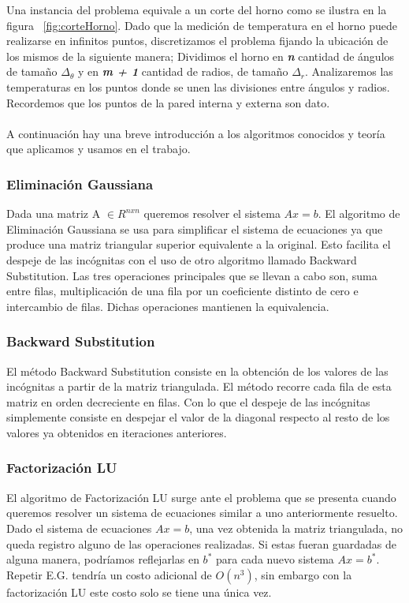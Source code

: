 Una instancia del problema equivale a un corte del horno como se ilustra en la figura ~\ref{fig:corteHorno}. Dado que la medición de temperatura en el horno puede realizarse en infinitos puntos, discretizamos el problema fijando la ubicación de los mismos de la siguiente manera; Dividimos el horno en \textbf{\textit{n}} cantidad de ángulos de tamaño $\Delta_{\theta}$ y en \textbf{\textit{m + 1}} cantidad de radios, de tamaño $\Delta_{r}$. Analizaremos las temperaturas en los puntos donde se unen las divisiones entre ángulos y radios. Recordemos que los puntos de la pared interna y externa son dato.\\
\\






A continuación hay una breve introducción a los algoritmos conocidos y teoría que aplicamos y usamos en el trabajo.

\subsubsection{Eliminación Gaussiana}
Dada una matriz A $\in R^{nxn}$ queremos resolver el sistema $Ax = b$. El algoritmo de Eliminación Gaussiana se usa para simplificar el sistema de ecuaciones ya que produce una matriz triangular superior equivalente a la original. Esto facilita el despeje de las incógnitas con el uso de otro algoritmo llamado Backward Substitution. Las tres operaciones principales que se llevan a cabo son, suma entre filas, multiplicación de una fila por un coeficiente distinto de cero e intercambio de filas. Dichas operaciones mantienen la equivalencia.

\subsubsection{Backward Substitution}
El método Backward Substitution consiste en la obtención de los valores de las incógnitas a partir de la matriz triangulada. El método recorre cada fila de esta matriz en orden decreciente en filas. Con lo que el despeje de las incógnitas simplemente consiste en despejar el valor de la diagonal respecto al resto de los valores ya obtenidos en iteraciones anteriores.

\subsubsection{Factorización LU}
El algoritmo de Factorización LU surge ante el problema que se presenta cuando queremos resolver un sistema de ecuaciones similar a uno anteriormente resuelto. Dado el sistema de ecuaciones $Ax = b$, una vez obtenida la matriz triangulada, no queda registro alguno de las operaciones realizadas. Si estas fueran guardadas de alguna manera, podríamos reflejarlas en $b^{*}$  para cada nuevo sistema $Ax = b^{*}$. Repetir E.G. tendría un costo adicional de $O(n^{3})$, sin embargo con la factorización LU este costo solo se tiene una única vez.


